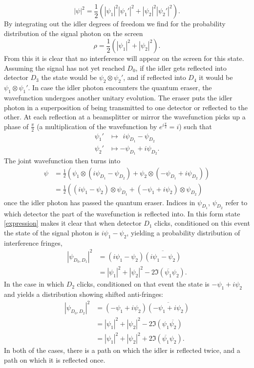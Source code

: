 \documentclass[12pt]{article}
\numberwithin{equation}{section}
\begin{document}
\begin{equation}
|\psi|^2= \frac{1}{2}(|\psi_1|^2|\psi_1'|^2+|\psi_2|^2|\psi_2'|^2).
\end{equation} By integrating out the idler degrees of freedom we find for the probability distribution of the signal photon on the screen
\begin{equation}
\rho= \frac{1}{2}(|\psi_1|^2+|\psi_2|^2).
\end{equation} From this it is clear that no interference will appear on the screen for this state. Assuming the signal has not yet reached $D_0$, if the idler gets reflected into detector $D_3$ the state would be $\psi_2\otimes \psi_2'$, and if reflected into $D_4$ it would be $\psi_1\otimes \psi_1'$. 
In case the idler photon encounters the quantum eraser, the wavefunction undergoes another unitary evolution. The eraser puts the idler photon in a superposition of being transmitted to one detector or reflected to the other. At each reflection at a beamsplitter or mirror the wavefunction picks up a phase of $\frac{\pi}{2}$ (a multiplication of the wavefunction by $e^{i\frac{\pi}{2}}=i$) such that
\begin{align}
\psi_1' &\mapsto \ ~ i\psi_{D_1}-\psi_{D_2}\nonumber\\
\psi_2' &\mapsto  -\psi_{D_1}+i\psi_{D_2}.
\end{align} The joint wavefunction then turns into
\begin{align}
\label{expression}
\psi &= \frac{1}{2}(\psi_1\otimes (i\psi_{D_1}-\psi_{D_2})+\psi_2\otimes (-\psi_{D_1}+i\psi_{D_2})) \nonumber \\ &=\frac{1}{2}((i\psi_{1}-\psi_{2})\otimes\psi_{D_1} + (-\psi_{1}+i\psi_{2})\otimes\psi_{D_2})
\end{align} 
once the idler photon has passed the quantum eraser. Indices in $\psi_{D_1}$, $\psi_{D_2}$ refer to which detector the part of the wavefunction is reflected into. In this form state \ref{expression} makes it clear that when detector $D_1$ clicks, conditioned on this event the state of the signal photon is $i\psi_{1}-\psi_{2}$, yielding a probability distribution of interference fringes, 
\begin{align}
|\psi_{D_0, D_1}|^2 &= (i\psi_{1}-\psi_{2})\overline{(i\psi_{1}-\psi_{2})}\nonumber \\
&=|\psi_1|^2+|\psi_2|^2-2\Im(\overline{\psi_1}\psi_2).
\end{align} In the case in which $D_2$ clicks, conditioned on that event the state is $-\psi_{1}+i\psi_{2}$ and yields a distribution showing shifted anti-fringes:
\begin{align}
|\psi_{D_0, D_2}|^2 &= (-\psi_{1}+i\psi_{2})\overline{(-\psi_{1}+i\psi_{2})} \nonumber 
\\ &=|\psi_1|^2+|\psi_2|^2-2\Im(\psi_1\overline{\psi_2}) \nonumber
\\ &=|\psi_1|^2+|\psi_2|^2+2\Im(\overline{\psi_1}\psi_2).
\end{align} In both of the cases, there is a path on which the idler is reflected twice, and a path on which it is reflected once.
\end{document}
